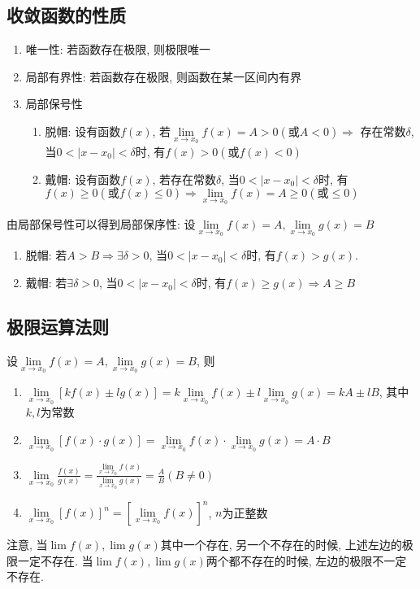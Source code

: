 \subsection{收敛函数的性质}
\begin{enumerate}
\item 唯一性: 若函数存在极限, 则极限唯一
\item 局部有界性: 若函数存在极限, 则函数在某一区间内有界
\item 局部保号性
\begin{enumerate}
\item 脱帽: 设有函数$ f(x) $, 若$ \lim\limits_{x\rightarrow x_{0}}f(x)=A>0(\text{或}A<0) \Rightarrow $ 存在常数$ \delta $, 当$ 0<|x-x_{0}|<\delta $时, 有$ f(x)>0(\text{或}f(x)<0) $
\item 戴帽: 设有函数$ f(x) $, 若存在常数$ \delta $, 当$ 0<|x-x_{0}|<\delta $时, 有$ f(x)\ge 0(\text{或}f(x)\le 0) \Rightarrow \lim\limits_{x\rightarrow x_{0}}f(x)=A\ge 0(\text{或}\le 0) $
\end{enumerate}
\end{enumerate}
\begin{tcolorbox}
由局部保号性可以得到局部保序性: 设$ \lim\limits_{x \rightarrow x_{0}}f(x)=A, \lim\limits_{x \rightarrow x_{0}}g(x)=B $
\begin{enumerate}
\item 脱帽: 若$ A>B\Rightarrow \exists \delta>0 $, 当$ 0<|x-x_{0}|<\delta $时, 有$ f(x)>g(x) $.
\item 戴帽: 若$ \exists \delta>0 $, 当$ 0<|x-x_{0}|<\delta $时, 有$ f(x)\ge g(x)\Rightarrow A\ge B $
\end{enumerate}
\end{tcolorbox}
\subsection{极限运算法则}
设$ \lim\limits_{x\rightarrow x_{0}}f(x)=A, \lim\limits_{x\rightarrow x_{0}}g(x)=B $, 则
\begin{enumerate}
\item $ \lim\limits_{x\rightarrow x_{0}}[kf(x)\pm lg(x)]=k \lim\limits_{x\rightarrow x_{0}}f(x)\pm l \lim\limits_{x\rightarrow x_{0}}g(x)=kA\pm lB $, 其中$ k,l $为常数
\item $ \lim\limits_{x\rightarrow x_{0}}[f(x)\cdot g(x)]=\lim\limits_{x\rightarrow x_{0}}f(x)\cdot \lim\limits_{x\rightarrow x_{0}}g(x)=A\cdot B $
\item $ \lim\limits_{x\rightarrow x_{0}}\frac{f(x)}{g(x)}=\frac{\lim\limits_{x\rightarrow x_{0}}f(x)}{\lim\limits_{x\rightarrow x_{0}}g(x)}=\frac{A}{B}(B\neq 0) $
\item $ \lim\limits_{x\rightarrow x_{0}}[f(x)]^{n}=[\lim\limits_{x\rightarrow x_{0}}f(x)]^{n} $, $ n $为正整数
\end{enumerate}\par
注意, 当$ \lim\limits f(x), \lim\limits g(x) $其中一个存在, 另一个不存在的时候, 上述左边的极限一定不存在. 当$ \lim\limits f(x), \lim\limits g(x) $两个都不存在的时候, 左边的极限不一定不存在.
